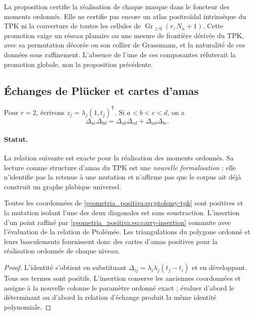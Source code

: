 La proposition certifie la réalisation de chaque masque dans le foncteur des moments ordonnés. Elle ne certifie pas encore un atlas positroïdal intrinsèque du TPK ni la couverture de toutes les cellules de \(\operatorname{Gr}_{\ge0}(r,N_n+1)\). Cette promotion exige un réseau planaire ou une mesure de frontière dérivée du TPK, avec sa permutation décorée ou son collier de Grassmann, et la naturalité de ces données sous raffinement. L’absence de l’une de ces composantes réfuterait la promotion globale, non la proposition précédente.

\subsection{Échanges de Plücker et cartes d’amas}

Pour \(r=2\), écrivons \(z_j=\lambda_j(1,t_j)^{\mathsf T}\). Si \(a<b<c<d\), on a
\begin{equation}
 \Delta_{ac}\Delta_{bd}
 =\Delta_{ab}\Delta_{cd}+\Delta_{ad}\Delta_{bc}.
 \label{geometria_positiva:eq:ptolemy-tpk}
\end{equation}

\paragraph{Statut.}
La relation suivante est exacte pour la réalisation des moments ordonnés. Sa lecture comme structure d’amas du TPK est une \emph{nouvelle formalisation} ; elle n’identifie pas la retenue à une mutation et n’affirme pas que le corpus ait déjà construit un graphe plabique universel.

\begin{proposition}
\label{geometria_positiva:thm:tpk-cluster-rank2} Toutes les coordonnées de \eqref{geometria_positiva:eq:ptolemy-tpk} sont positives et la mutation isolant l’une des deux diagonales est sans soustraction. L’insertion d’un point raffiné par \eqref{geometria_positiva:eq:carry-insertion} commute avec l’évaluation de la relation de Ptolémée. Les triangulations du polygone ordonné et leurs basculements fournissent donc des cartes d’amas positives pour la réalisation ordonnée de chaque niveau.
\end{proposition}
\begin{proof}
L’identité s’obtient en substituant \(\Delta_{ij}=\lambda_i\lambda_j(t_j-t_i)\) et en développant. Tous ses termes sont positifs. L’insertion conserve les anciennes coordonnées et assigne à la nouvelle colonne le paramètre ordonné exact ; évaluer d’abord le déterminant ou d’abord la relation d’échange produit la même identité polynomiale.
\end{proof}

